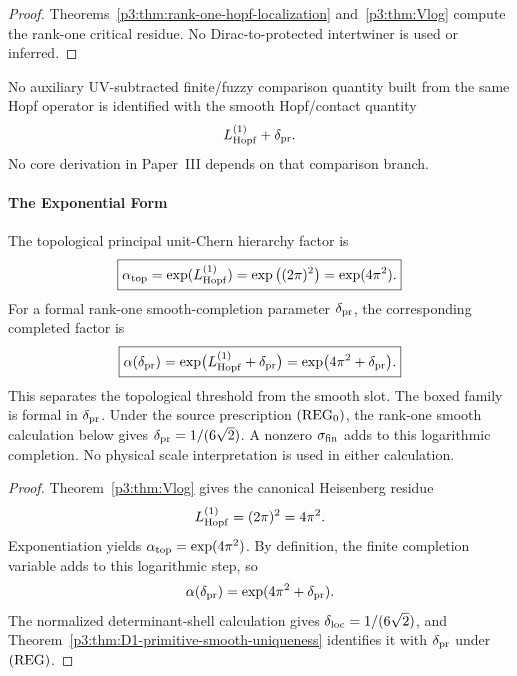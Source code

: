 \documentclass[12pt,a4paper]{article}
\begin{document}
\begin{proof}
Theorems~\ref{p3:thm:rank-one-hopf-localization} and~\ref{p3:thm:Vlog}
compute the rank-one critical residue.  No Dirac-to-protected intertwiner is
used or inferred.
\end{proof}


\begin{remark}
\leavevmode\par\noindent
No auxiliary UV-subtracted finite/fuzzy comparison quantity built from the
same Hopf operator is identified with the smooth Hopf/contact quantity
\[
  L_{\mathrm{Hopf}}^{(1)}+\delta_{\rm pr}.
\]
No core derivation in Paper~III depends on that comparison branch.
\end{remark}

\paragraph{The Exponential Form}

\begin{theorem}
\label{p3:thm:alpha_step}
The topological principal unit-Chern hierarchy factor is
\begin{equation}
\boxed{
\alpha_{\rm top}
=\exp(L_{\mathrm{Hopf}}^{(1)})
=\exp\left((2\pi)^2\right)
=\exp(4\pi^2).
}
\end{equation}
For a formal rank-one smooth-completion parameter \(\delta_{\rm pr}\), the corresponding completed factor is
\begin{equation}
\boxed{
\alpha(\delta_{\rm pr})
=
\exp\!\big(L_{\mathrm{Hopf}}^{(1)}+\delta_{\rm pr}\big)
=
\exp\!\big(4\pi^2+\delta_{\rm pr}\big).
}
\end{equation}
This separates the topological threshold from the smooth slot.  The boxed
family is formal in \(\delta_{\rm pr}\).  Under the source prescription
\(({\rm REG}_0)\), the rank-one smooth calculation below gives
\(\delta_{\rm pr}=1/(6\sqrt2)\).  A nonzero \(\sigma_{\rm fin}\) adds to this
logarithmic completion.  No physical scale interpretation is used in either
calculation.
\end{theorem}

\begin{proof}
Theorem~\ref{p3:thm:Vlog} gives the canonical Heisenberg residue
\[
  L_{\mathrm{Hopf}}^{(1)}=(2\pi)^2=4\pi^2.
\]
Exponentiation yields \(\alpha_{\rm top}=\exp(4\pi^2)\).  By definition,
the finite completion variable adds to this logarithmic step, so
\[
  \alpha(\delta_{\rm pr})
  =\exp(4\pi^2+\delta_{\rm pr}).
\]
The normalized determinant-shell calculation gives
\(\delta_{\rm loc}=1/(6\sqrt2)\), and
Theorem~\ref{p3:thm:D1-primitive-smooth-uniqueness} identifies it with
\(\delta_{\rm pr}\) under \(({\rm REG})\).
\end{proof}
\end{document}

